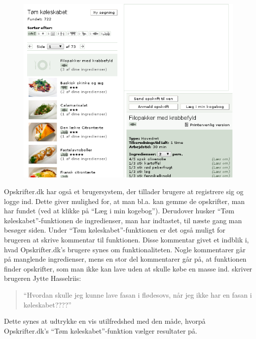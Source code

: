 \begin{figure}[H]
\centering
\includegraphics[scale=0.7]{billeder/forbilleder/opskrifterdk2.png}
\label{fig:opskrifterdk2}
\end{figure}

Opskrifter.dk har også et brugersystem, der tillader brugere at registrere sig og logge ind. Dette giver mulighed for, at man bl.a. kan gemme de opskrifter, man har fundet (ved at klikke på ``Læg i min kogebog''). Derudover husker ``Tøm køleskabet''-funktionen de ingredienser, man har indtastet, til næste gang man besøger siden.
Under ``Tøm køleskabet''-funktionen er det også muligt for brugeren at skrive kommentar til funktionen. Disse kommentar givet et indblik i, hvad Opskrifter.dk’s brugere synes om funktionaliteten. Nogle kommentarer går på manglende ingredienser, mens en stor del kommentarer går på, at funktionen finder opskrifter, som man ikke kan lave uden at skulle købe en masse ind. \Fx skriver brugeren Jytte Hasselriis:

\begin{quote}
``Hvordan skulle jeg kunne lave fasan i flødesovs, når jeg ikke har en fasan i køleskabet????''
\end{quote}

Dette synes at udtrykke en vis utilfredshed med den måde, hvorpå Opskrifter.dk’s ``Tøm køleskabet''-funktion vælger resultater på.